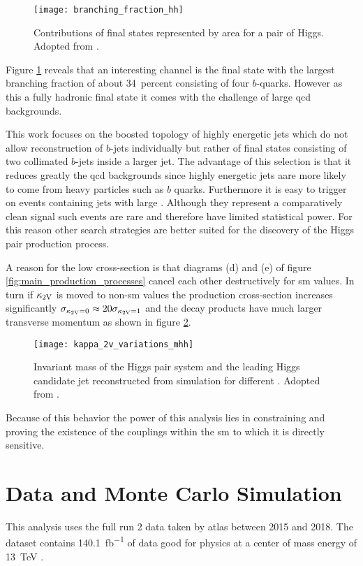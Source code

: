 \begin{figure}
    \centering
    \texttt{[image: branching\_fraction\_hh]}
    \caption[]{Contributions of final states represented by area for a pair of Higgs. Adopted from \citep{ATL-COM-PHYS-2020-083}.}
    \label{fig:branching_fraction_hh}
\end{figure}
Figure \ref{fig:branching_fraction_hh} reveals that an interesting channel is the final state with the largest branching fraction of about \qty[]{34}{percent} consisting of four $b$-quarks. However as this a fully hadronic final state it comes with the challenge of large \ac{qcd} backgrounds.

This work focuses on the boosted topology of highly energetic jets which do not allow reconstruction of $b$-jets individually but rather of final states consisting of two collimated $b$-jets inside a larger jet. The advantage of this selection is that it reduces greatly the \ac{qcd} backgrounds since highly energetic jets aare more likely to come from heavy particles such as $b$ quarks. Furthermore it is easy to trigger on events containing jets with large \pt. Although they represent a comparatively clean signal such events are rare and therefore have limited statistical power. For this reason other search strategies are better suited for the discovery of the Higgs pair production process.

A reason for the low cross-section is that diagrams (d) and (e) of figure \ref{fig:main_production_processes} cancel each other destructively for \ac{sm} values. In turn if $\kappa_{\text{2V}}$ is moved to non-\ac{sm} values the production cross-section increases significantly $\sigma_{\kappa_{\text{2V}}=0}\approx 20\sigma_{\kappa_{\text{2V}}=1}$ \citep{bishara2017higgs} and the decay products have much larger transverse momentum as shown in figure \ref{fig:kappa_2v_variations_mhh}.
\begin{figure}
    \centering
    \texttt{[image: kappa\_2v\_variations\_mhh]}
    \caption[]{Invariant mass of the Higgs pair system and the leading Higgs candidate jet \pt  reconstructed from simulation for different \ktwov. Adopted from \citep{ATL-PHYS-PUB-2019-007}.}
    \label{fig:kappa_2v_variations_mhh}
\end{figure}
Because of this behavior the power of this analysis lies in constraining and proving the existence of the \ktwov couplings within the \ac{sm} to which it is directly sensitive.



\section{Data and Monte Carlo Simulation}
This analysis uses the full run 2 data taken by \ac{atlas} between 2015 and 2018. The dataset contains \qty[]{140.1}{fb^{-1}} of data good for physics at a center of mass energy of \qty[]{13}{TeV} \citep{DAPR-2021-01}.

